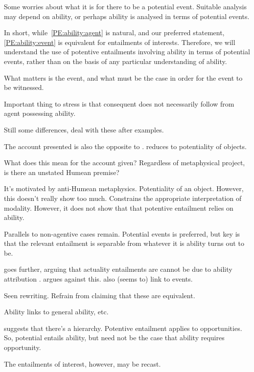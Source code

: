 \begin{note}
  Some worries about what it is for there to be a potential event.
  Suitable analysis may depend on ability, or perhaps ability is analysed in terms of potential events.

  In short, while~\ref{PE:ability:agent} is natural, and our preferred statement, \ref{PE:ability:event} is equivalent for entailments of interests.
  Therefore, we will understand the use of potentive entailments involving ability in terms of potential events, rather than on the basis of any particular understanding of ability.

  What matters is the event, and what must be the case in order for the event to be witnessed.

  Important thing to stress is that consequent does not necessarily follow from agent possessing ability.

  Still some differences, deal with these after examples.
\end{note}

\begin{note}[Vetter]
  The account presented is also the opposite to \cite{Vetter:2013vf}.
  \textcite{Vetter:2013vf} reduces to potentiality of objects.

  What does this mean for the account given?
  Regardless of metaphysical project, is there an unstated Humean premise?

  It's motivated by anti-Humean metaphysics.
  Potentiality of an object.
  However, this doesn't really show too much.
  Constrains the appropriate interpretation of modality.
  However, it does not show that that potentive entailment relies on ability.

  Parallels to non-agentive cases remain.
  Potential events is preferred, but key is that the relevant entailment is separable from whatever it is ability turns out to be.
\end{note}

\begin{note}
  \citeauthor{Bhatt:1999ud} goes further, arguing that actuality entailments are cannot be due to ability attribution \citeyear[\S4.2]{Bhatt:1999ud}.
  \cite{Hacquard:2006to} argues against this.
  \citeauthor{Hacquard:2006to} also (seems to) link to events.
\end{note}

\begin{note}
  Seen rewriting.
  Refrain from claiming that these are equivalent.

  Ability links to general ability, etc.\

  \textcite{Werner:2011tp} suggests that there's a hierarchy.
  Potentive entailment applies to opportunities.
  So, potential entails ability, but need not be the case that ability requires opportunity.

  The entailments of interest, however, may be recast.
\end{note}

